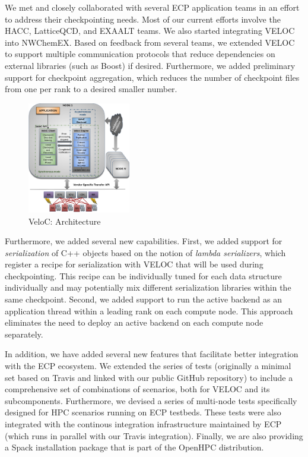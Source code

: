 We met and closely collaborated with several ECP application teams in
an effort to address their checkpointing needs. Most of our current
efforts involve the HACC, LatticeQCD, and EXAALT teams. We also
started integrating VELOC into NWChemEX. Based on feedback from
several teams, we extended VELOC to support multiple communication
protocols that reduce dependencies on external libraries (such as
Boost) if desired.  Furthermore, we added preliminary support for
checkpoint aggregation, which reduces the number of checkpoint files
from one per rank to a desired smaller number.

\begin{figure}
  \includegraphics[width=0.4\textwidth]{projects/2.3.4-DataViz/2.3.4.14-VeloC-SZ/veloc-arch}
  \caption{VeloC: Architecture}%
  \label{fig:veloc:arch}%
\end{figure}

Furthermore, we added several new capabilities. First, we added
support for \emph{serialization} of C++ objects based on the notion
of \emph{lambda serializers}, which register a recipe for
serialization with VELOC that will be used during checkpointing. This
recipe can be individually tuned for each data structure individually
and may potentially mix different serialization libraries within the
same checkpoint. Second, we added support to run the active backend as
an application thread within a leading rank on each compute node. This
approach eliminates the need to deploy an active backend on each
compute node separately.

In addition, we have added several new features that facilitate better
integration with the ECP ecosystem. We extended the series of tests
(originally a minimal set based on Travis and linked with our public
GitHub repository) to include a comprehensive set of combinations of
scenarios, both for VELOC and its subcomponents. Furthermore, we
devised a series of multi-node tests specifically designed for
HPC scenarios running on ECP testbeds. These tests were also integrated
with the continous integration infrastructure maintained by ECP
(which runs in parallel with our Travis integration). Finally, we
are also providing a Spack installation package that is part of the
OpenHPC distribution.

